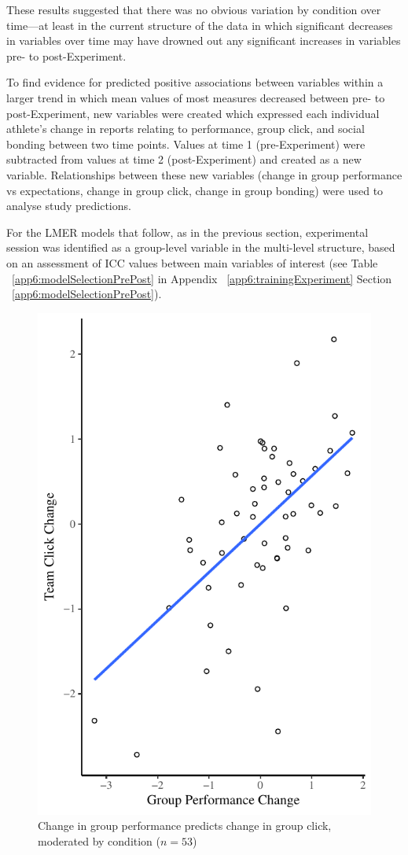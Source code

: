 These results suggested that there was no obvious variation by condition over time---at least in the current structure of the data in which significant decreases in variables over time may have drowned out any significant increases in variables pre- to post-Experiment.


To find evidence for predicted positive associations between variables within a larger trend in which mean values of most measures decreased between pre- to post-Experiment, new variables were created which expressed each individual athlete's change in reports relating to performance, group click, and social bonding between two time points.  Values at time 1 (pre-Experiment) were subtracted from values at time 2 (post-Experiment) and created as a new variable.  Relationships between these new variables (change in group performance vs expectations, change in group click, change in group bonding) were used to analyse study predictions.



For the LMER models that follow, as in the previous section, experimental session was identified as a group-level variable in the multi-level structure, based on an assessment of ICC values between main variables of interest (see Table ~\ref{app6:modelSelectionPrePost} in Appendix ~\ref{app6:trainingExperiment} Section ~\ref{app6:modelSelectionPrePost}).




\begin{figure}
    \centering
    \includegraphics[width=0.5\linewidth,keepaspectratio] {images/groupPerfClickChangeCondition}
    \caption{Change in group performance predicts change in group click, moderated by condition ($n = 53$)}
    \label{fig:groupPerfClickChangeCondition}
\end{figure}

